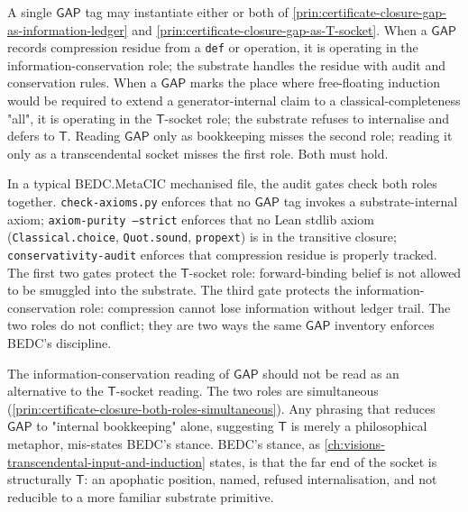 \begin{principle}
\label{prin:certificate-closure-both-roles-simultaneous}
A single $\mathsf{GAP}$ tag may instantiate either or both of \autoref{prin:certificate-closure-gap-as-information-ledger} and \autoref{prin:certificate-closure-gap-as-T-socket}. When a $\mathsf{GAP}$ records compression residue from a \texttt{def} or \NameCert{} operation, it is operating in the information-conservation role; the substrate handles the residue with audit and conservation rules. When a $\mathsf{GAP}$ marks the place where free-floating induction would be required to extend a generator-internal claim to a classical-completeness "all", it is operating in the $\mathsf{T}$-socket role; the substrate refuses to internalise and defers to $\mathsf{T}$. Reading $\mathsf{GAP}$ only as bookkeeping misses the second role; reading it only as a transcendental socket misses the first role. Both must hold.
\end{principle}

\begin{example}
\label{ex:certificate-closure-two-roles-visible}
In a typical BEDC.MetaCIC mechanised file, the audit gates check both roles together. \texttt{check-axioms.py} enforces that no $\mathsf{GAP}$ tag invokes a substrate-internal axiom; \texttt{axiom-purity --strict} enforces that no Lean stdlib axiom (\texttt{Classical.choice}, \texttt{Quot.sound}, \texttt{propext}) is in the transitive closure; \texttt{conservativity-audit} enforces that compression residue is properly tracked. The first two gates protect the $\mathsf{T}$-socket role: forward-binding belief is not allowed to be smuggled into the substrate. The third gate protects the information-conservation role: compression cannot lose information without ledger trail. The two roles do not conflict; they are two ways the same $\mathsf{GAP}$ inventory enforces BEDC's discipline.
\end{example}

\begin{remark}
\label{rem:certificate-closure-information-does-not-soften}
The information-conservation reading of $\mathsf{GAP}$ should not be read as an alternative to the $\mathsf{T}$-socket reading. The two roles are simultaneous (\autoref{prin:certificate-closure-both-roles-simultaneous}). Any phrasing that reduces $\mathsf{GAP}$ to "internal bookkeeping" alone, suggesting $\mathsf{T}$ is merely a philosophical metaphor, mis-states BEDC's stance. BEDC's stance, as \autoref{ch:visions-transcendental-input-and-induction} states, is that the far end of the socket is structurally $\mathsf{T}$: an apophatic position, named, refused internalisation, and not reducible to a more familiar substrate primitive.
\end{remark}

